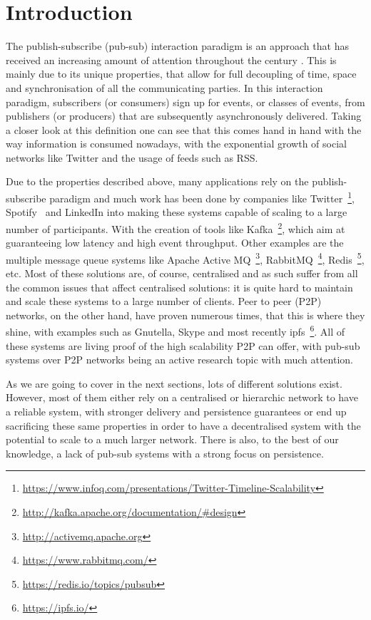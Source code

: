 
\section{Introduction}\label{section:introduction}


The publish-subscribe (pub-sub) interaction paradigm is an approach that has
received an increasing amount of attention throughout the century
\cite{Kermarrec2013} \cite{Eugster2003}. This is mainly due to its unique
properties, that allow for full decoupling of time, space and synchronisation
of all the communicating parties. In this interaction paradigm, subscribers (or
consumers) sign up for events, or classes of events, from publishers (or
producers) that are subsequently asynchronously delivered. Taking a closer look
at this definition one can see that this comes hand in hand with the way
information is consumed nowadays, with the exponential growth of social
networks like Twitter and the usage of feeds such as RSS.

Due to the properties described above, many applications rely on the
publish-subscribe paradigm and much work has been done by companies like
Twitter~\footnote{\url{https://www.infoq.com/presentations/Twitter-Timeline-Scalability}},
Spotify~\cite{Setty2013} and LinkedIn into making these systems capable of
scaling to a large number of participants. With the creation of tools like
Kafka~\footnote{\url{http://kafka.apache.org/documentation/\#design}}, which
aim at guaranteeing low latency and high event throughput. Other examples are
the multiple message queue systems like Apache Active
MQ~\footnote{\url{http://activemq.apache.org}},
RabbitMQ~\footnote{\url{https://www.rabbitmq.com/}},
Redis~\footnote{\url{https://redis.io/topics/pubsub}}, etc. Most of these
solutions are, of course, centralised and as such suffer from all the common
issues that affect centralised solutions: it is quite hard to maintain and
scale these systems to a large number of clients. Peer to peer (P2P) networks,
on the other hand, have proven numerous times, that this is where they shine,
with examples such as Gnutella, Skype and most recently
ipfs~\footnote{\url{https://ipfs.io/}}. All of these systems are living proof
of the high scalability P2P can offer, with pub-sub systems over P2P networks
being an active research topic with much attention.

As we are going to cover in the next sections, lots of different solutions
exist. However, most of them either rely on a centralised or hierarchic network
to have a reliable system, with stronger delivery and persistence guarantees
or end up sacrificing these same properties in order to have a decentralised
system with the potential to scale to a much larger network. There is also, to
the best of our knowledge, a lack of pub-sub systems with a strong focus on
persistence.

